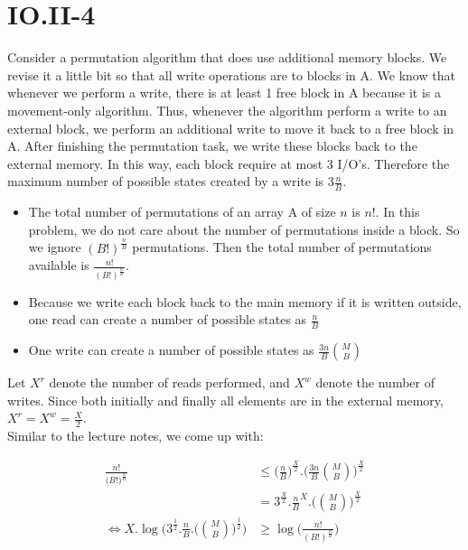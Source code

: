 \section*{IO.II-4}
Consider a permutation algorithm that does use additional memory blocks. We revise it a little bit so that all write operations are 
to blocks in A. We know that whenever we perform a write, there is at least 1 free block in A because it is a movement-only 
algorithm. Thus, whenever the algorithm perform a write to an external block, we perform an additional write to move it back to a
free block in A. After finishing the permutation task, we write these blocks back to the external memory. In this way, each block require at most 3 I/O's. Therefore the maximum number of possible states created by a write is $3\frac{n}{B} $. \\

\begin{itemize} 
  \item The total number of permutations of an array A of size $n$ is $n!$. In this problem, we do not care about the number of 
permutations inside a block. So we ignore $(B!)^{\frac{n}{B} }$ permutations. Then the total number of permutations available is 
$\frac{n!}{(B!)^{\frac{n}{B} }}$.
\item Because we write each block back to the main memory if it is written outside, one read can create a number of possible states as $\frac{n}{B} $
\item One write can create a number of possible states as $\frac{3n}{B} \binom MB$
\end{itemize}

Let $X^r$ denote the number of reads performed, and $X^w$ denote the number of writes. Since both initially and finally all elements are in the external memory, $X^r = X^w = \frac{X}{2}$. \\ 

Similar to the lecture notes, we come up with:

\begin{equation*}
  \begin{aligned}
  \frac{n!}{\big(B!\big)^{\frac{n}{B}}} &\leq \bigg(\frac{n}{B} \bigg)^{\frac{X}{2}} . \bigg(\frac{3n}{B} \binom MB\bigg)^{\frac{X}{2}} \\
  &= 3^{\frac{X}{2}}.\frac{n}{B}^X.\bigg(\binom MB\bigg)^{\frac{X}{2}} \\
  \iff X.\log \bigg(3^\frac{1}{2}.\frac{n}{B}.\bigg(\binom MB\bigg)^\frac{1}{2} \bigg) &\geq \log \bigg(\frac{n!}{(B!)^{\frac{n}{B}}}\bigg)
\end{aligned}
\end{equation*}

